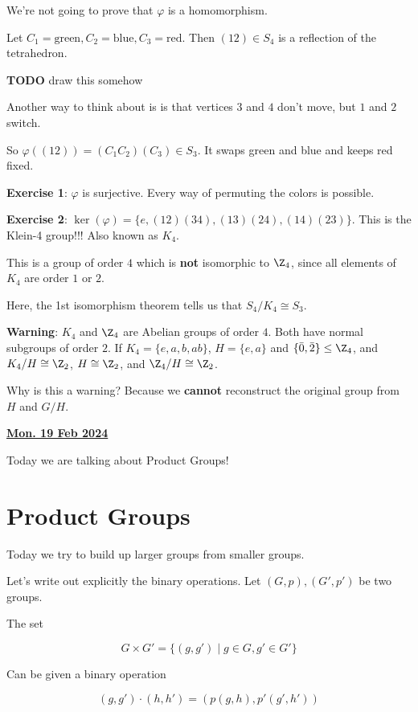 \documentclass[12pt]{article}
\renewcommand{\date}[1]{\underline{\bf #1}}
\newcommand{\TODO}{\color{red}\textbf{TODO}\color{black}}
\begin{document}
We're not going to prove that $\varphi$ is a homomorphism.

Let $C_1 = \text{green}, C_2 = \text{blue}, C_3 = \text{red}$. Then $(12) \in
S_4$ is a reflection of the tetrahedron.

\TODO{} draw this somehow

Another way to think about is is that vertices $3$ and $4$ don't move, but $1$
and $2$ switch.

So $\varphi((12)) = (C_1 C_2)(C_3) \in S_3$. It swaps green and blue and keeps
red fixed.

{\bf Exercise 1}: $\varphi$ is surjective. Every way of permuting the colors is
possible.

{\bf Exercise 2}: $\ker(\varphi) = \{e, (12)(34), (13)(24), (14)(23) \}$. This
is the Klein-4 group!!! Also known as $K_4$.

This is a group of order $4$ which is {\bf not} isomorphic to $\Z_4$, since all
elements of $K_4$ are order $1$ or $2$.

Here, the 1st isomorphism theorem tells us that $S_4 / K_4 \cong S_3$.

{\bf Warning}: $K_4$ and $\Z_4$ are Abelian groups of order $4$. Both have
normal subgroups of order $2$. If $K_4 = \{e, a, b, ab\}$, $H = \{e, a\}$ and
$\{\bar 0, \bar 2\} \le \Z_4$, and $K_4 / H \cong \Z_2$, $H \cong \Z_2$, and
$\Z_4 / H \cong \Z_2$.

Why is this a warning? Because we {\bf cannot} reconstruct the original group
from $H$ and $G / H$.


\date{Mon. 19 Feb 2024}

Today we are talking about Product Groups!

\section{Product Groups}

Today we try to build up larger groups from smaller groups.

Let's write out explicitly the binary operations. Let $(G, p), (G', p')$ be two
groups.

The set

\[
  G \times G' = \{(g, g') \mid g \in G, g' \in G' \}
\]

Can be given a binary operation

\[
  (g, g') \cdot (h, h') = (p(g, h), p'(g', h'))
\]
\end{document}
